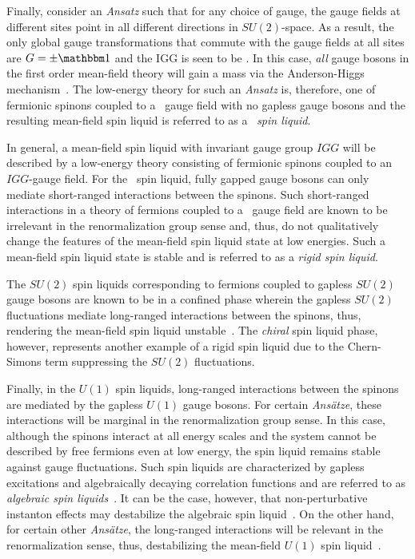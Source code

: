 Finally, consider an \textit{Ansatz} such that for any choice of gauge, the gauge fields at different sites point in all different directions in $SU(2)$-space.
As a result, the only global gauge transformations that commute with the gauge fields at all sites are $G = \pm \id$ and the IGG is seen to be \ZZ.
In this case, \textit{all} gauge bosons in the first order mean-field theory will gain a mass via the Anderson-Higgs mechanism~\cite{WenPRB1991,WenPRB2002,Wen2004}.
The low-energy theory for such an \textit{Ansatz} is, therefore, one of fermionic spinons coupled to a \ZZ~gauge field with no gapless gauge bosons and the resulting mean-field spin liquid is referred to as a \ZZ~\textit{spin liquid}.

In general, a mean-field spin liquid with invariant gauge group $IGG$ will be described by a low-energy theory consisting of fermionic spinons coupled to an $IGG$-gauge field.
For the \ZZ~spin liquid, fully gapped gauge bosons can only mediate short-ranged interactions between the spinons.
Such short-ranged interactions in a theory of fermions coupled to a \ZZ~gauge field are known to be irrelevant in the renormalization group sense and, thus, do not qualitatively change the features of the mean-field spin liquid state at low energies.
Such a mean-field spin liquid state is stable and is referred to as a \textit{rigid spin liquid}.

The $SU(2)$ spin liquids corresponding to fermions coupled to gapless $SU(2)$ gauge bosons are known to be in a confined phase wherein the gapless $SU(2)$ fluctuations mediate long-ranged interactions between the spinons, thus, rendering the mean-field spin liquid unstable~\cite{WenPRB2002,Wen2004}.
The \textit{chiral} spin liquid phase, however, represents another example of a rigid spin liquid due to the Chern-Simons term suppressing the $SU(2)$ fluctuations.

Finally, in the $U(1)$ spin liquids, long-ranged interactions between the spinons are mediated by the gapless $U(1)$ gauge bosons.
For certain \textit{Ans\"atze}, these interactions will be marginal in the renormalization group sense.
In this case, although the spinons interact at all energy scales and the system cannot be described by free fermions even at low energy, the spin liquid remains stable against gauge fluctuations.
Such spin liquids are characterized by gapless excitations and algebraically decaying correlation functions and are referred to as \textit{algebraic spin liquids}~\cite{RantnerPRL2001}.
It can be the case, however, that non-perturbative instanton effects may destabilize the algebraic spin liquid~\cite{IoffePRB1989}.
On the other hand, for certain other \textit{Ans\"atze}, the long-ranged interactions will be relevant in the renormalization sense, thus, destabilizing the mean-field $U(1)$ spin liquid~\cite{WenPRB2002}.


